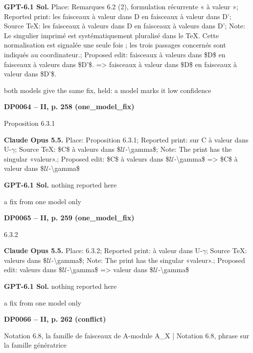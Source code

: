 \textbf{GPT-6.1 Sol.} Place: Remarques 6.2 (2), formulation récurrente « à valeur »; Reported print: les faisceaux à valeur dans D en faisceaux à valeur dans D'; Source TeX: les faisceaux à valeurs dans D en faisceaux à valeurs dans D'; Note: Le singulier imprimé est systématiquement pluralisé dans le TeX. Cette normalisation est signalée une seule fois ; les trois passages concernés sont indiqués au coordinateur.; Proposed edit: faisceaux à valeurs dans \$D\$ en   faisceaux à valeurs dans \$D'\$. =\allowbreak > faisceaux à valeur dans \$D\$ en   faisceaux à valeur dans \$D'\$.\par
both models give the same fix, held: a model marks it low confidence\par
\par\noindent\hypertarget{DP0064}{}\textbf{DP0064 -- II, p. 258 (one\_model\_fix)}\par
Proposition 6.3.1\par
\textbf{Claude Opus 5.5.} Place: Proposition 6.3.1; Reported print: sur C à valeur dans U-\ensuremath{\gamma}; Source TeX: \$C\$ à valeurs dans \$\ensuremath{𝒰}-\textbackslash{}gamma\$; Note: The print has the singular «valeur».; Proposed edit: \$C\$ à valeurs dans \$\ensuremath{𝒰}-\textbackslash{}gamma\$ =\allowbreak > \$C\$ à valeur dans \$\ensuremath{𝒰}-\textbackslash{}gamma\$\par
\textbf{GPT-6.1 Sol.} nothing reported here\par
a fix from one model only\par
\par\noindent\hypertarget{DP0065}{}\textbf{DP0065 -- II, p. 259 (one\_model\_fix)}\par
6.3.2\par
\textbf{Claude Opus 5.5.} Place: 6.3.2; Reported print: à valeur dans U-\ensuremath{\gamma}; Source TeX: valeurs dans \$\ensuremath{𝒰}-\textbackslash{}gamma\$; Note: The print has the singular «valeur».; Proposed edit: valeurs dans \$\ensuremath{𝒰}-\textbackslash{}gamma\$ =\allowbreak > valeur dans \$\ensuremath{𝒰}-\textbackslash{}gamma\$\par
\textbf{GPT-6.1 Sol.} nothing reported here\par
a fix from one model only\par
\par\noindent\hypertarget{DP0066}{}\textbf{DP0066 -- II, p. 262 (conflict)}\par
Notation 6.8, la famille de faisceaux de A-module A\_X | Notation 6.8, phrase sur la famille génératrice\par
